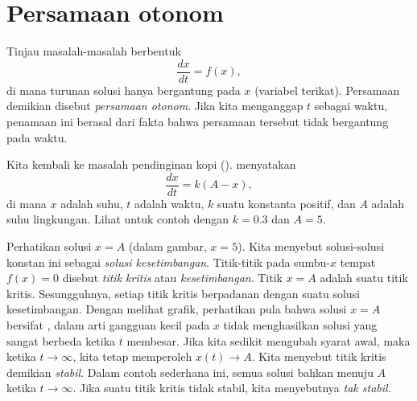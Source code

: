 \sectionnewpage
\section{Persamaan otonom}
\label{auteq:section}


Tinjau
masalah-masalah berbentuk
\begin{equation*}
\frac{dx}{dt} = f(x) ,
\end{equation*}
di mana turunan solusi hanya bergantung pada $x$ (variabel
terikat). Persamaan demikian disebut \emph{persamaan
otonom}. Jika kita menganggap
$t$ sebagai waktu, penamaan ini berasal dari fakta bahwa persamaan tersebut
tidak bergantung pada waktu.

Kita kembali ke masalah pendinginan kopi
().
menyatakan
\begin{equation*}
\frac{dx}{dt} = k (A-x) ,
\end{equation*}
di mana $x$ adalah suhu, $t$ adalah waktu, $k$ suatu konstanta positif,
dan $A$ adalah
suhu lingkungan. Lihat  untuk contoh
dengan $k=0.3$ dan $A=5$.

Perhatikan solusi $x=A$ (dalam gambar, $x=5$).
Kita menyebut solusi-solusi konstan ini sebagai
\emph{solusi kesetimbangan}.
Titik-titik pada sumbu-$x$ tempat $f(x) = 0$ disebut
\emph{titik kritis} atau
\emph{kesetimbangan}.
Titik $x=A$ adalah suatu titik kritis.
Sesungguhnya, setiap
titik kritis berpadanan dengan suatu solusi kesetimbangan.
Dengan melihat grafik, perhatikan pula bahwa solusi $x=A$ bersifat
, dalam arti
gangguan kecil pada $x$ tidak menghasilkan solusi yang sangat berbeda
ketika $t$ membesar.
Jika kita sedikit mengubah syarat awal, maka ketika
$t \to \infty$, kita tetap memperoleh $x(t) \to A$.
Kita menyebut titik kritis demikian
\emph{stabil}.
Dalam contoh sederhana ini, semua solusi bahkan menuju $A$
ketika $t \to \infty$. Jika suatu titik kritis tidak stabil, kita menyebutnya
\emph{tak stabil}.


